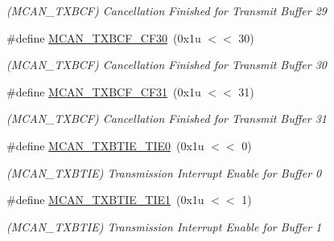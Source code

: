 \begin{DoxyCompactItemize}
\begin{DoxyCompactList}\small\item\em (M\+C\+A\+N\+\_\+\+T\+X\+B\+CF) Cancellation Finished for Transmit Buffer 29 \end{DoxyCompactList}\item 
\mbox{\label{group__SAMV71__MCAN_gaba4dbc4aa0368bf5093453048dc5b107}} 
\#define \mbox{\hyperlink{group__SAMV71__MCAN_gaba4dbc4aa0368bf5093453048dc5b107}{M\+C\+A\+N\+\_\+\+T\+X\+B\+C\+F\+\_\+\+C\+F30}}~(0x1u $<$$<$ 30)
\begin{DoxyCompactList}\small\item\em (M\+C\+A\+N\+\_\+\+T\+X\+B\+CF) Cancellation Finished for Transmit Buffer 30 \end{DoxyCompactList}\item 
\mbox{\label{group__SAMV71__MCAN_ga8d906c9e2f5e1fa9e691f71451a4a869}} 
\#define \mbox{\hyperlink{group__SAMV71__MCAN_ga8d906c9e2f5e1fa9e691f71451a4a869}{M\+C\+A\+N\+\_\+\+T\+X\+B\+C\+F\+\_\+\+C\+F31}}~(0x1u $<$$<$ 31)
\begin{DoxyCompactList}\small\item\em (M\+C\+A\+N\+\_\+\+T\+X\+B\+CF) Cancellation Finished for Transmit Buffer 31 \end{DoxyCompactList}\item 
\mbox{\label{group__SAMV71__MCAN_ga7d29e3e409c31eecf76909bc98b3305b}} 
\#define \mbox{\hyperlink{group__SAMV71__MCAN_ga7d29e3e409c31eecf76909bc98b3305b}{M\+C\+A\+N\+\_\+\+T\+X\+B\+T\+I\+E\+\_\+\+T\+I\+E0}}~(0x1u $<$$<$ 0)
\begin{DoxyCompactList}\small\item\em (M\+C\+A\+N\+\_\+\+T\+X\+B\+T\+IE) Transmission Interrupt Enable for Buffer 0 \end{DoxyCompactList}\item 
\mbox{\label{group__SAMV71__MCAN_ga83955556a0e3af9745192ca3f53cf607}} 
\#define \mbox{\hyperlink{group__SAMV71__MCAN_ga83955556a0e3af9745192ca3f53cf607}{M\+C\+A\+N\+\_\+\+T\+X\+B\+T\+I\+E\+\_\+\+T\+I\+E1}}~(0x1u $<$$<$ 1)
\begin{DoxyCompactList}\small\item\em (M\+C\+A\+N\+\_\+\+T\+X\+B\+T\+IE) Transmission Interrupt Enable for Buffer 1 \end{DoxyCompactList}\item 

\end{DoxyCompactItemize}

